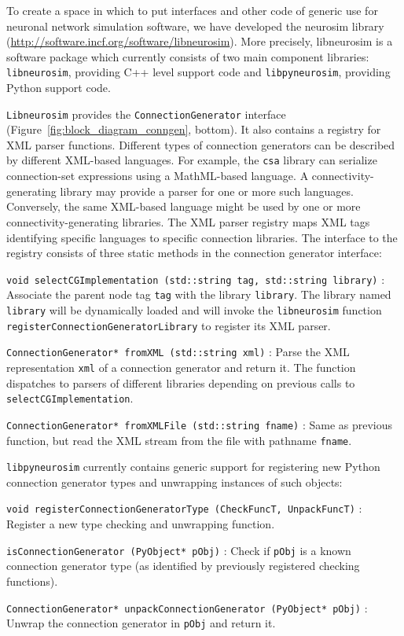 \documentclass{frontiersSCNS} %
\newcommand{\Figure}[2]{Figure~\ref{#2}}
\newcommand{\Figure}[2]{Figure~#1}
\begin{document}
To create a space in which to put interfaces and other code of generic
use for neuronal network simulation software, we have developed the
neurosim library
(\url{http://software.incf.org/software/libneurosim}).  More
precisely, libneurosim is a software package which currently consists
of two main component libraries: \verb|libneurosim|, providing C++
level support code and \verb|libpyneurosim|, providing Python support
code.

\verb|Libneurosim| provides the \verb|ConnectionGenerator| interface
(\Figure{2}{fig:block_diagram_conngen}, bottom). It also contains a
registry for XML parser functions.  Different types of connection
generators can be described by different XML-based languages.  For
example, the \verb|csa| library can serialize connection-set
expressions using a MathML-based language.  A connectivity-generating
library may provide a parser for one or more such languages.
Conversely, the same XML-based language might be used by one or more
connectivity-generating libraries.  The XML parser registry maps XML
tags identifying specific languages to specific connection libraries.
The interface to the registry consists of three static methods in the
connection generator interface:

\begin{unlist}
\item[\tt void selectCGImplementation (std::string tag, std::string
  library)]:\\ Associate the parent node tag \verb|tag| with the library
  \verb|library|.  The library named \verb|library| will be
  dynamically loaded and will invoke the \verb|libneurosim| function
  \verb|registerConnectionGeneratorLibrary| to register its XML
  parser.
\item[\tt ConnectionGenerator* fromXML (std::string xml)]: Parse the
  XML representation \verb|xml| of a connection generator and return
  it. The function dispatches to parsers of different libraries
  depending on previous calls to \verb|selectCGImplementation|.
\item[\tt ConnectionGenerator* fromXMLFile (std::string fname)]: Same
  as previous function, but read the XML stream from the file with
  pathname \verb|fname|.
\end{unlist}

\verb|libpyneurosim| currently contains generic support for
registering new Python connection generator types and unwrapping
instances of such objects:

\begin{unlist}
\item[\tt void registerConnectionGeneratorType (CheckFuncT,
  UnpackFuncT)]: Register a new type checking and unwrapping
  function.
\item[\tt isConnectionGenerator (PyObject* pObj)]: Check if
  \verb|pObj| is a known connection generator type (as identified by
  previously registered checking functions).
\item[\tt ConnectionGenerator* unpackConnectionGenerator (PyObject*
  pObj)]: Unwrap the connection generator in \verb|pObj| and return
  it.
\end{unlist}
\end{document}

